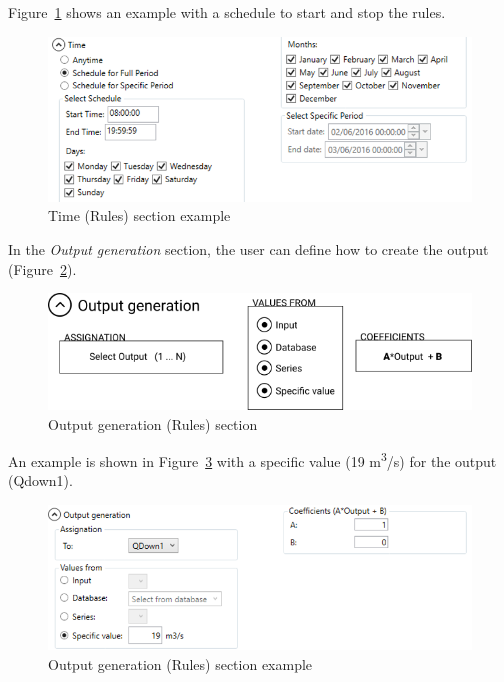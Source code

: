\documentclass[
  letterpaper,
  DIV=11,
  numbers=noendperiod]{scrreprt}
\begin{document}
Figure~\ref{fig-planner_time_rules_section_example} shows an example
with a schedule to start and stop the rules.

\begin{figure}

{\centering \includegraphics{./figures/fig-planner_time_rules_section_example.png}

}

\caption{\label{fig-planner_time_rules_section_example}Time (Rules)
section example}

\end{figure}

In the \emph{Output generation} section, the user can define how to
create the output (Figure~\ref{fig-planner_output_generation_section}).

\begin{figure}

{\centering \includegraphics{./figures/fig-planner_output_generation_section.png}

}

\caption{\label{fig-planner_output_generation_section}Output generation
(Rules) section}

\end{figure}

An example is shown in
Figure~\ref{fig-planner_output_generation_section_example} with a
specific value (19 m\textsuperscript{3}/s) for the output (Qdown1).

\begin{figure}

{\centering \includegraphics{./figures/fig-planner_output_generation_section_example.png}

}

\caption{\label{fig-planner_output_generation_section_example}Output
generation (Rules) section example}

\end{figure}
\end{document}
